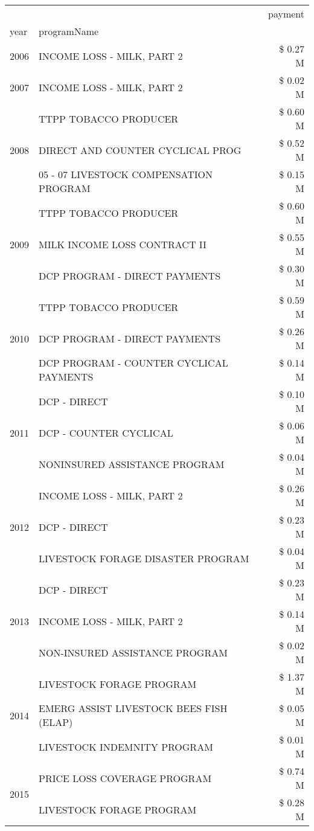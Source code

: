 \begin{tabular}{llr}
\toprule
 &  & payment \\
year & programName &  \\
\midrule
2006 & INCOME LOSS - MILK, PART 2 & \$ 0.27 M \\
\cline{1-3}
2007 & INCOME LOSS - MILK, PART 2 & \$ 0.02 M \\
\cline{1-3}
\multirow[t]{3}{*}{2008} & TTPP TOBACCO PRODUCER & \$ 0.60 M \\
 & DIRECT AND COUNTER CYCLICAL PROG & \$ 0.52 M \\
 & 05 - 07 LIVESTOCK COMPENSATION PROGRAM & \$ 0.15 M \\
\cline{1-3}
\multirow[t]{3}{*}{2009} & TTPP TOBACCO PRODUCER & \$ 0.60 M \\
 & MILK INCOME LOSS CONTRACT II & \$ 0.55 M \\
 & DCP PROGRAM - DIRECT PAYMENTS & \$ 0.30 M \\
\cline{1-3}
\multirow[t]{3}{*}{2010} & TTPP TOBACCO PRODUCER & \$ 0.59 M \\
 & DCP PROGRAM - DIRECT PAYMENTS & \$ 0.26 M \\
 & DCP PROGRAM - COUNTER CYCLICAL PAYMENTS & \$ 0.14 M \\
\cline{1-3}
\multirow[t]{3}{*}{2011} & DCP - DIRECT & \$ 0.10 M \\
 & DCP - COUNTER CYCLICAL & \$ 0.06 M \\
 & NONINSURED ASSISTANCE PROGRAM & \$ 0.04 M \\
\cline{1-3}
\multirow[t]{3}{*}{2012} & INCOME LOSS - MILK, PART 2 & \$ 0.26 M \\
 & DCP - DIRECT & \$ 0.23 M \\
 & LIVESTOCK FORAGE DISASTER PROGRAM & \$ 0.04 M \\
\cline{1-3}
\multirow[t]{3}{*}{2013} & DCP - DIRECT & \$ 0.23 M \\
 & INCOME LOSS - MILK, PART 2 & \$ 0.14 M \\
 & NON-INSURED ASSISTANCE PROGRAM & \$ 0.02 M \\
\cline{1-3}
\multirow[t]{3}{*}{2014} & LIVESTOCK FORAGE PROGRAM & \$ 1.37 M \\
 & EMERG ASSIST LIVESTOCK BEES FISH (ELAP) & \$ 0.05 M \\
 & LIVESTOCK INDEMNITY PROGRAM & \$ 0.01 M \\
\cline{1-3}
\multirow[t]{3}{*}{2015} & PRICE LOSS COVERAGE PROGRAM & \$ 0.74 M \\
 & LIVESTOCK FORAGE PROGRAM & \$ 0.28 M \\

\end{tabular}
